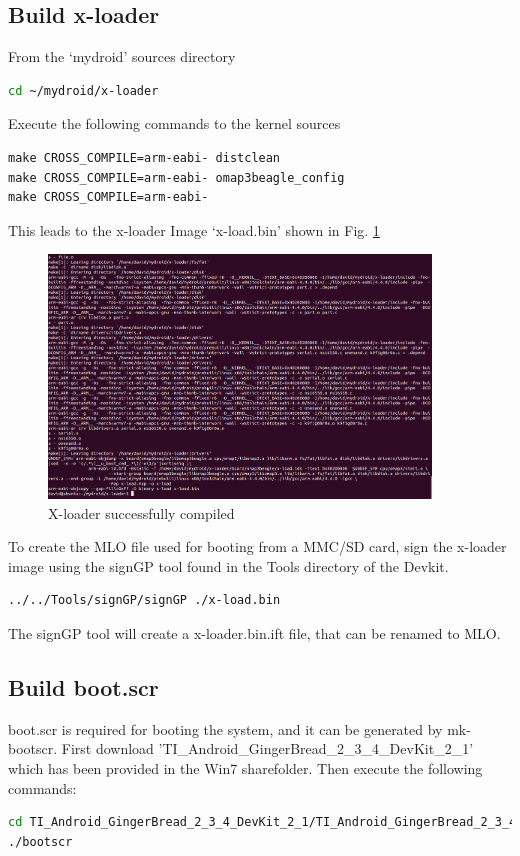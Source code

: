 \documentclass[12pt,journal,draftclsnofoot,onecolumn]{IEEEtran}
\begin{document}
\subsection{Build x-loader}
From the `mydroid' sources directory

\begin{lstlisting}[language={bash}]
cd ~/mydroid/x-loader
\end{lstlisting}

Execute the following commands to the kernel sources

\begin{lstlisting}[language={make}]
make CROSS_COMPILE=arm-eabi- distclean
make CROSS_COMPILE=arm-eabi- omap3beagle_config
make CROSS_COMPILE=arm-eabi-
\end{lstlisting}

This leads to the x-loader Image `x-load.bin' shown in Fig. \ref{x-loader}

\begin{figure}[ht]
	\centering
	\includegraphics[width=4in]{./figs/x-loader.png}
	\caption{X-loader successfully compiled}
	\label{x-loader}
\end{figure}

To create the MLO file used for booting from a MMC/SD card, sign the x-loader image using the signGP tool found
in the Tools directory of the Devkit. 

\begin{lstlisting}[language={bash}]
../../Tools/signGP/signGP ./x-load.bin
\end{lstlisting}

The signGP tool will create a x-loader.bin.ift file, that can be renamed to MLO.

\subsection{Build boot.scr}
boot.scr is required for booting the system, and it can be generated by mk-bootscr.
First download 'TI\_Android\_GingerBread\_2\_3\_4\_DevKit\_2\_1' which has been provided in the Win7 sharefolder.
Then execute the following commands:
\begin{lstlisting}[language={bash}]
cd TI_Android_GingerBread_2_3_4_DevKit_2_1/TI_Android_GingerBread_2_3_4_DevKit_2_1/Tools/mk-bootscr/
./bootscr
\end{lstlisting}
 
\end{document}

